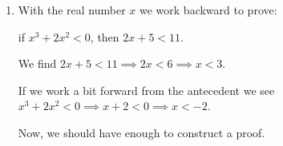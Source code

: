 \documentclass[12pt,letterpaper]{article}
\begin{document}
\begin{enumerate}
\begin{enumerate}
\begin{enumerate}
              Since $\frac{1}{4}, b^2, b^2$ are all non-negative,
              we have the last inequality if $ab > 0$ and $bc < 0$.

              Looks like we have some way to proceed.

              \begin{proof}
                Assume $ab > 0$ and $bc < 0$.

                Then we know none of $a, b, c$ is 0.

                We have

                \begin{align*}
                  (ab)(bc) &< 0 \\
                  (ab)(bc) &< 0 \leq \frac{1}{4}b^2b^2 && \text{ since } b^2 \geq 0 \\
                  (ab)(bc) &< \frac{1}{4}b^2b^2 \\
                  ab^2c &< \frac{1}{4}b^2b^2 \\
                  ac &< \frac{1}{4}b^2 \\
                  4ac &< b^2 \\
                  0 &< b^2 - 4ac \\
                \end{align*}

                Since $b^2 - 4ac > 0$ we know that
                $x = \frac{-b \pm \sqrt{b^2 - 4ac}}{2a}$
                has exactly two real solutions.

                These solutions are:
                \[
                  x_1 = \frac{-b + \sqrt{b^2 - 4ac}}{2a}
                  ,
                  x_2 = \frac{-b - \sqrt{b^2 - 4ac}}{2a}
                \]

                Thus,
                if $ab > 0$ and $bc < 0$, then $ax^2 + bx + c = 0$ has two real solutions.
              \end{proof}
            \item
              With the real number $x$ we work backward to prove:

              if $x^3 + 2x^2 < 0$, then $2x + 5 < 11$.

              We find $2x + 5 < 11 \implies 2x < 6 \implies x < 3$.

              If we work a bit forward from the antecedent we see
              $x^3 + 2x^2 < 0 \implies x + 2 < 0 \implies x < -2$.

              Now, we should have enough to construct a proof.


\end{enumerate}
\end{enumerate}
\end{enumerate}
\end{document}
